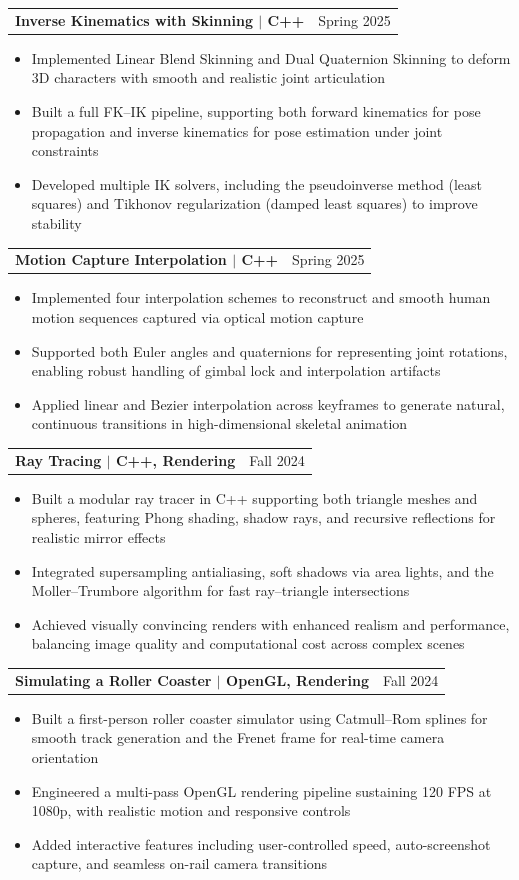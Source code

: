 \documentclass[letterpaper,11pt]{article}
\newcommand{\resumeItem}[1]{
  \item\small{
    {#1 \vspace{-2pt}}
  }
}
\newcommand{\resumeProjectHeading}[2]{
    \item
    \begin{tabularx}{\textwidth}[t]{X r}
        \textbf{#1} & #2 \\
    \end{tabularx}\vspace{-7pt}
}
\newcommand{\resumeItemListStart}{\begin{itemize}}
\newcommand{\resumeItemListEnd}{\end{itemize}\vspace{-5pt}}
\begin{document}
  \resumeProjectHeading {\textbf{Inverse Kinematics with Skinning} $|$ \normalfont C++}{Spring 2025}
  \resumeItemListStart
      \resumeItem{Implemented Linear Blend Skinning and Dual Quaternion Skinning to deform 3D characters with smooth and realistic joint articulation}
      \resumeItem{Built a full FK–IK pipeline, supporting both forward kinematics for pose propagation and inverse kinematics for pose estimation under joint constraints}
      \resumeItem{Developed multiple IK solvers, including the pseudoinverse method (least squares) and Tikhonov regularization (damped least squares) to improve stability}
  \resumeItemListEnd

  \resumeProjectHeading {\textbf{Motion Capture Interpolation} $|$ \normalfont C++}{Spring 2025}
  \resumeItemListStart
      \resumeItem{Implemented four interpolation schemes to reconstruct and smooth human motion sequences captured via optical motion capture}
      \resumeItem{Supported both Euler angles and quaternions for representing joint rotations, enabling robust handling of gimbal lock and interpolation artifacts}
      \resumeItem{Applied linear and Bezier interpolation across keyframes to generate natural, continuous transitions in high-dimensional skeletal animation}
  \resumeItemListEnd

  \resumeProjectHeading {\textbf{Ray Tracing} $|$ \normalfont C++, Rendering}{Fall 2024}
      \resumeItemListStart
          \resumeItem{Built a modular ray tracer in C++ supporting both triangle meshes and spheres, featuring Phong shading, shadow rays, and recursive reflections for realistic mirror effects}
          \resumeItem{Integrated supersampling antialiasing, soft shadows via area lights, and the Moller–Trumbore algorithm for fast ray–triangle intersections}
          \resumeItem{Achieved visually convincing renders with enhanced realism and performance, balancing image quality and computational cost across complex scenes}
      \resumeItemListEnd
  
  \resumeProjectHeading
      {\textbf{Simulating a Roller Coaster} $|$ \normalfont OpenGL, Rendering}{Fall 2024}
      \resumeItemListStart
          \resumeItem{Built a first-person roller coaster simulator using Catmull–Rom splines for smooth track generation and the Frenet frame for real-time camera orientation}
          \resumeItem{Engineered a multi-pass OpenGL rendering pipeline sustaining 120 FPS at 1080p, with realistic motion and responsive controls}
          \resumeItem{Added interactive features including user-controlled speed, auto-screenshot capture, and seamless on-rail camera transitions}
      \resumeItemListEnd
  
\end{document}
